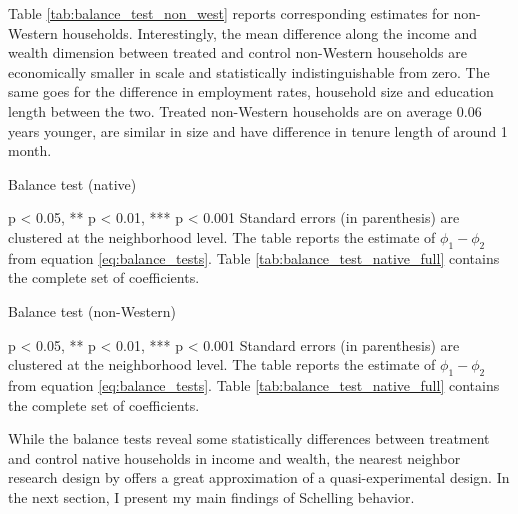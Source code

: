 \documentclass[main.tex]{subfiles}
\begin{document}
Table \ref{tab:balance_test_non_west} reports corresponding estimates for non-Western households. Interestingly, the mean difference along the income and wealth dimension between treated and control non-Western households are economically smaller in scale and statistically indistinguishable from zero. The same goes for the difference in employment rates, household size and education length between the two. Treated non-Western households are on average 0.06 years younger, are similar in size and have difference in tenure length of around 1 month. 


\begin{table}[H]
    \centering
    \caption{Balance test (native)}
    \label{tab:balance_test_native}
    \begin{adjustbox}{width = \linewidth, center}
    \begin{threeparttable}
        
\begin{tablenotes}[flushleft]
    \item \footnotesize * p < 0.05, ** p < 0.01, *** p < 0.001 Standard errors (in parenthesis) are clustered at the neighborhood level. The table reports the estimate of $\phi_1 - \phi_2$ from equation \ref{eq:balance_tests}. Table \ref{tab:balance_test_native_full} contains the complete set of coefficients.
\end{tablenotes}
\end{threeparttable}
\end{adjustbox}
\end{table}

\begin{table}[H]
    \centering
    \caption{Balance test (non-Western)}
    \label{tab:balance_test_non_west}
    \begin{adjustbox}{width = \linewidth, center}
    \begin{threeparttable}
        
\begin{tablenotes}[flushleft]
    \item \footnotesize * p < 0.05, ** p < 0.01, *** p < 0.001 Standard errors (in parenthesis) are clustered at the neighborhood level. The table reports the estimate of $\phi_1 - \phi_2$ from equation \ref{eq:balance_tests}. Table \ref{tab:balance_test_native_full} contains the complete set of coefficients.
\end{tablenotes}
\end{threeparttable}
\end{adjustbox}
\end{table}
While the balance tests reveal some statistically differences between treatment and control native households in income and wealth, the nearest neighbor research design by \textcite{Bayer_2022_nearest_neighbor} offers a great approximation of a quasi-experimental design. In the next section, I present my main findings of Schelling behavior.
\end{document}
